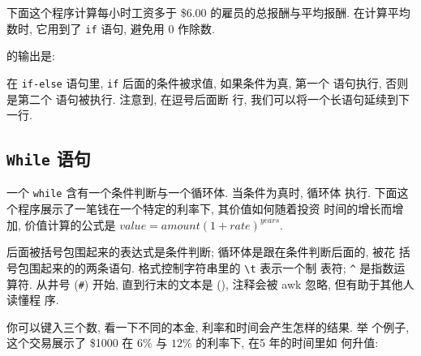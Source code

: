 下面这个程序计算每小时工资多于 \$6.00 的雇员的总报酬与平均报酬. 在计算平均
数时, 它用到了 \texttt{if} 语句, 避免用 0 作除数.
 的输出是:
在 \verb'if-else' 语句里, \verb'if' 后面的条件被求值, 如果条件为真, 第一个
\print 语句执行, 否则是第二个 \print 语句被执行. 注意到, 在逗号后面断
行, 我们可以将一个长语句延续到下一行.

\subsection{\texttt{While} 语句}
\label{subsec:while_statement}

一个 \texttt{while} 含有一个条件判断与一个循环体. 当条件为真时, 循环体
执行. 下面这个程序展示了一笔钱在一个特定的利率下, 其价值如何随着投资
时间的增长而增加, 价值计算的公式是 $value = amount (1 + rate)^{years}$.
\while 后面被括号包围起来的表达式是条件判断; 循环体是跟在条件判断后面的,
被花
括号包围起来的的两条语句. \printf 格式控制字符串里的 \verb'\t' 表示一个制
表符; \verb'^' 是指数运算符. 从井号 (\verb'#') 开始, 直到行末的文本是
 (), 注释会被 awk 忽略, 但有助于其他人读懂程
序.

你可以键入三个数, 看一下不同的本金, 利率和时间会产生怎样的结果. 举
个例子, 这个交易展示了 \$1000 在 $6\%$ 与 $12\%$ 的利率下, 在5 年的时间里如
何升值:

